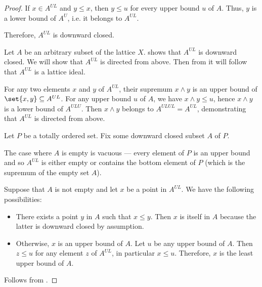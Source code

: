 \begin{proof}
   If \( x \in A^{UL} \) and \( y \leq x \), then \( y \leq u \) for every upper bound \( u \) of \( A \). Thus, \( y \) is a lower bound of \( A^U \), i.e. it belongs to \( A^{UL} \).

  Therefore, \( A^{UL} \) is downward closed.

   Let \( A \) be an arbitrary subset of the lattice \( X \).  shows that \( A^{UL} \) is downward closed. We will show that \( A^{UL} \) is directed from above. Then from  it will follow that \( A^{UL} \) is a lattice ideal.

  For any two elements \( x \) and \( y \) of \( A^{UL} \), their supremum \( x \wedge y \) is an upper bound of \( \set{ x, y } \subseteq A^{UL} \). For any upper bound \( u \) of \( A \), we have \( x \wedge y \leq u \), hence \( x \wedge y \) is a lower bound of \( A^{ULU} \). Then \( x \wedge y \) belongs to \( A^{ULUL} = A^{UL} \), demonstrating that \( A^{UL} \) is directed from above.

   Let \( P \) be a totally ordered set. Fix some downward closed subset \( A \) of \( P \).

  The case where \( A \) is empty is vacuous --- every element of \( P \) is an upper bound and so \( A^{UL} \) is either empty or contains the bottom element of \( P \) (which is the supremum of the empty set \( A \)).

  Suppose that \( A \) is not empty and let \( x \) be a point in \( A^{UL} \). We have the following possibilities:
  \begin{itemize}
    \item There exists a point \( y \) in \( A \) such that \( x \leq y \). Then \( x \) is itself in \( A \) because the latter is downward closed by assumption.
    \item Otherwise, \( x \) is an upper bound of \( A \). Let \( u \) be any upper bound of \( A \). Then \( z \leq u \) for any element \( z \) of \( A^{UL} \), in particular \( x \leq u \). Therefore, \( x \) is the least upper bound of \( A \).
  \end{itemize}

   Follows from .
\end{proof}

